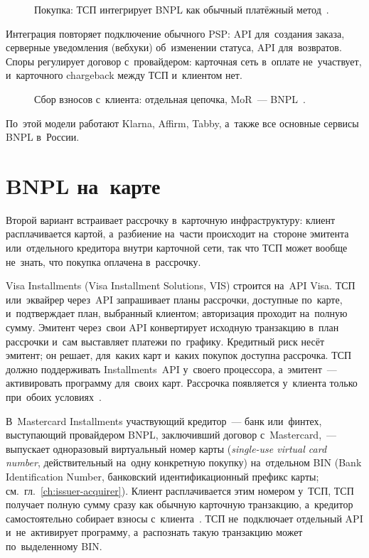 \begin{figure}[htbp]
  \centering
  \caption{Покупка: ТСП интегрирует BNPL как обычный платёжный
  метод~\cite{klarna-settlement-reports,tbank-dolyame-api}.}\label{fig:bnpl-psp-purchase}
\end{figure}

Интеграция повторяет подключение обычного PSP: API для~создания заказа,
серверные уведомления (вебхуки) об~изменении статуса, API для~возвратов.
Споры регулирует договор с~провайдером: карточная сеть в~оплате
не~участвует, и~карточного chargeback между ТСП и~клиентом нет.

\begin{figure}[htbp]
  \centering
  \caption{Сбор взносов с~клиента: отдельная цепочка, MoR~---
  BNPL~\cite{mrc-nti-trace-id}.}\label{fig:bnpl-psp-installments}
\end{figure}

По~этой модели работают Klarna, Affirm, Tabby, а~также все основные сервисы
BNPL в~России.

\FloatBarrier
\section{BNPL на~карте}\label{sec:bnpl-on-card}

Второй вариант встраивает рассрочку в~карточную инфраструктуру: клиент
расплачивается картой, а~разбиение на~части происходит на~стороне эмитента
или~отдельного кредитора внутри карточной сети, так что ТСП может вообще
не~знать, что покупка оплачена в~рассрочку.

Visa Installments (Visa Installment Solutions, VIS) строится на~API Visa.
ТСП или~эквайрер через~API запрашивает планы рассрочки, доступные по~карте,
и~подтверждает план, выбранный клиентом; авторизация проходит на~полную сумму.
Эмитент через~свои API конвертирует исходную транзакцию в~план рассрочки
и~сам выставляет платежи по~графику. Кредитный риск несёт эмитент; он решает,
для~каких карт и~каких покупок доступна рассрочка. ТСП должно поддерживать
Installments~API у~своего процессора, а~эмитент~--- активировать программу
для~своих карт. Рассрочка появляется у~клиента только при~обоих
условиях~\cite{visa-installments}.

В~Mastercard Installments участвующий кредитор~--- банк или~финтех, выступающий провайдером BNPL,
заключивший договор с~Mastercard,~--- выпускает одноразовый виртуальный номер
карты (\textit{single-use virtual card number}, действительный на~одну конкретную
покупку) на~отдельном BIN (Bank Identification Number, банковский
идентификационный префикс карты; см.~гл.~\ref{ch:issuer-acquirer}). Клиент
расплачивается этим номером у~ТСП, ТСП получает полную сумму сразу как обычную
карточную транзакцию, а~кредитор самостоятельно собирает взносы
с~клиента~\cite{mc-installments}. ТСП не~подключает отдельный API
и~не~активирует программу, а~распознать такую транзакцию может
по~выделенному BIN.


